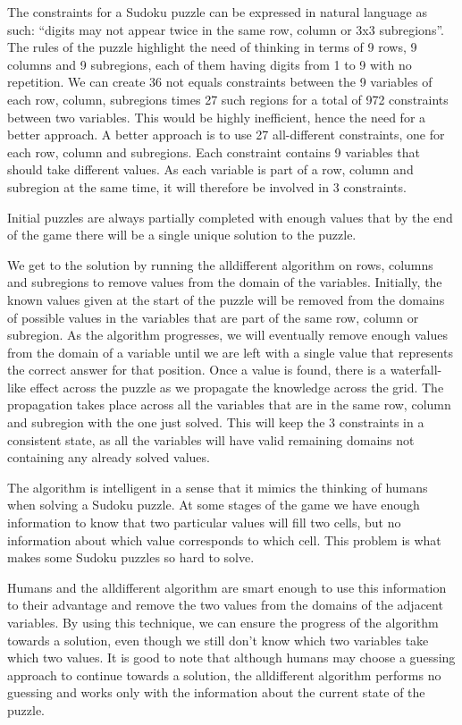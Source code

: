 \documentclass{l4proj}
\begin{document}
\noindent The constraints for a Sudoku puzzle can be expressed in natural language as such: “digits may not appear twice in the same row, column or 3x3 subregions”. The rules of the puzzle highlight the need of thinking in terms of 9 rows, 9 columns and 9 subregions, each of them having digits from 1 to 9 with no repetition. We can create 36 not equals constraints between the 9 variables of each row, column, subregions times 27 such regions for a total of 972 constraints between two variables. This would be highly inefficient, hence the need for a better approach. A better approach is to use 27 all-different constraints, one for each row, column and subregions. Each constraint contains 9 variables that should take different values. As each variable is part of a row, column and subregion at the same time, it will therefore be involved in 3 constraints.

\noindent Initial puzzles are always partially completed with enough values that by the end of the game there will be a single unique solution to the puzzle. 

\noindent We get to the solution by running the alldifferent algorithm on rows, columns and subregions to remove values from the domain of the variables. Initially, the known values given at the start of the puzzle will be removed from the domains of possible values in the variables that are part of the same row, column or subregion. As the algorithm progresses, we will eventually remove enough values from the domain of a variable until we are left with a single value that represents the correct answer for that position. Once a value is found, there is a waterfall-like effect across the puzzle as we propagate the knowledge across the grid. The propagation takes place across all the variables that are in the same row, column and subregion with the one just solved. This will keep the 3 constraints in a consistent state, as all the variables will have valid remaining domains not containing any already solved values.

\noindent The algorithm is intelligent in a sense that it mimics the thinking of humans when solving a Sudoku puzzle. At some stages of the game we have enough information to know that two particular values will fill two cells, but no information about which value corresponds to which cell. This problem is what makes some Sudoku puzzles so hard to solve.

\noindent Humans and the alldifferent algorithm are smart enough to use this information to their advantage and remove the two values from the domains of the adjacent variables. By using this technique, we can ensure the progress of the algorithm towards a solution, even though we still don’t know which two variables take which two values. It is good to note that although humans may choose a guessing approach to continue towards a solution, the alldifferent algorithm performs no guessing and works only with the information about the current state of the puzzle.
\end{document}
